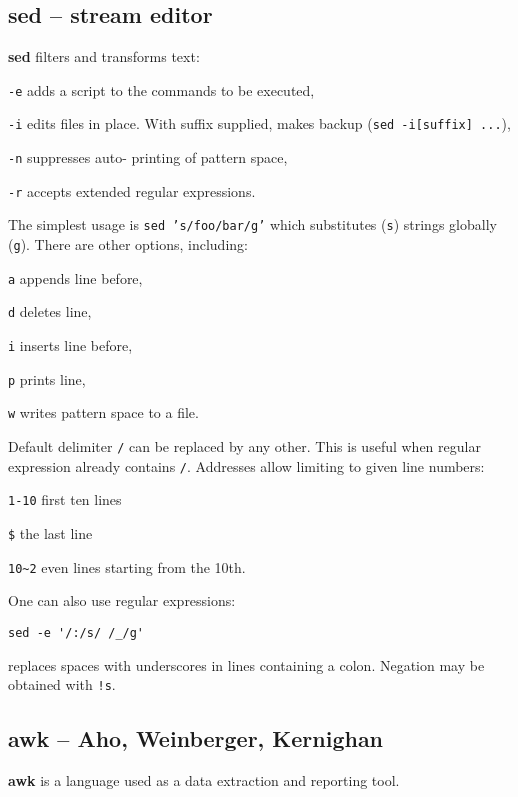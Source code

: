 \subsection{sed -- stream editor}
\begin{compactenum}
	\item [\cmdcore] \textbf{sed} filters and transforms text:
	\item [\texttt{-e}] adds a script to the commands to be executed,
	\item [\texttt{-i}] edits files in place. With suffix supplied, makes backup (\texttt{sed -i[suffix] ...}), 
	\item [\texttt{-n}] suppresses auto- printing of pattern space,
  \item [\texttt{-r}] accepts extended regular expressions.
\end{compactenum}

The simplest usage is \texttt{sed 's/foo/bar/g'}
which substitutes (\texttt{s}) strings globally (\texttt{g}).
There are other options, including:
\begin{compactenum}
\item [\texttt{a}] appends line before,
\item [\texttt{d}] deletes line,
\item [\texttt{i}] inserts line before,
\item [\texttt{p}] prints line,
\item [\texttt{w}] writes pattern space to a file.
\end{compactenum}

Default delimiter \texttt{/} can be replaced by any other.
This is useful when regular expression already contains \texttt{/}.
Addresses allow limiting to given line numbers:
\begin{compactenum}
\item \texttt{1-10} first ten lines
\item \texttt{\$} the last line
\item \texttt{10\textasciitilde 2} even lines starting from the 10th.
\end{compactenum}

One can also use regular expressions:
\begin{verbatim}
sed -e '/:/s/ /_/g'
\end{verbatim}
replaces spaces with underscores in lines containing a colon.
Negation may be obtained with \texttt{!s}.


\subsection{awk -- Aho, Weinberger, Kernighan}
\begin{compactenum}
\item [\cmdvar] \textbf{awk} is a language used as a data extraction and reporting tool.
\end{compactenum}


